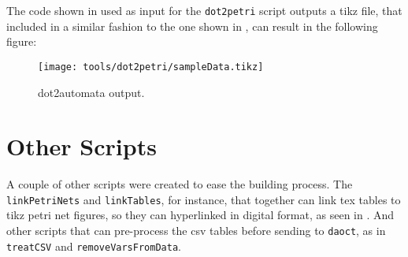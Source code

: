 The code shown in  used as input for the
\verb|dot2petri| script outputs a tikz file, that included in a similar fashion
to the one shown in , can result in the following figure:

\begin{figure}[H]
  \centering
  \texttt{[image: tools/dot2petri/sampleData.tikz]}
  \caption{dot2automata output.}
  \label{fig:Dot2automataSampleOutput}
\end{figure}

\section{Other Scripts}
\label{sec:otherScripts}
A couple of other scripts were created to ease the building process. The 
\verb|linkPetriNets| and \verb|linkTables|, for instance, that together can link tex tables to
tikz petri net figures, so they can hyperlinked in digital format, as seen in
. And other scripts that can pre-process the csv
tables before sending to \verb|daoct|, as in \verb|treatCSV| and \verb|removeVarsFromData|.


